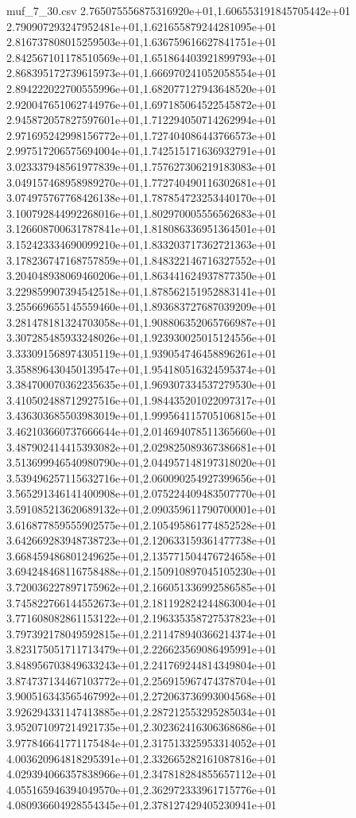 \begin{filecontents*}{muf_7_30.csv}
2.765075556875316920e+01,1.606553191845705442e+01
2.790907293247952481e+01,1.621655879244281095e+01
2.816737808015259503e+01,1.636759616627841751e+01
2.842567101178510569e+01,1.651864403921899793e+01
2.868395172739615973e+01,1.666970241052058554e+01
2.894222022700555996e+01,1.682077127943648520e+01
2.920047651062744976e+01,1.697185064522545872e+01
2.945872057827597601e+01,1.712294050714262994e+01
2.971695242998156772e+01,1.727404086443766573e+01
2.997517206575694004e+01,1.742515171636932791e+01
3.023337948561977839e+01,1.757627306219183083e+01
3.049157468958989270e+01,1.772740490116302681e+01
3.074975767768426138e+01,1.787854723253440170e+01
3.100792844992268016e+01,1.802970005556562683e+01
3.126608700631787841e+01,1.818086336951364501e+01
3.152423334690099210e+01,1.833203717362721363e+01
3.178236747168757859e+01,1.848322146716327552e+01
3.204048938069460206e+01,1.863441624937877350e+01
3.229859907394542518e+01,1.878562151952883141e+01
3.255669655145559460e+01,1.893683727687039209e+01
3.281478181324703058e+01,1.908806352065766987e+01
3.307285485933248026e+01,1.923930025015124556e+01
3.333091568974305119e+01,1.939054746458896261e+01
3.358896430450139547e+01,1.954180516324595374e+01
3.384700070362235635e+01,1.969307334537279530e+01
3.410502488712927516e+01,1.984435201022097317e+01
3.436303685503983019e+01,1.999564115705106815e+01
3.462103660737666644e+01,2.014694078511365660e+01
3.487902414415393082e+01,2.029825089367386681e+01
3.513699946540980790e+01,2.044957148197318020e+01
3.539496257115632716e+01,2.060090254927399656e+01
3.565291346141400908e+01,2.075224409483507770e+01
3.591085213620689132e+01,2.090359611790700001e+01
3.616877859555902575e+01,2.105495861774852528e+01
3.642669283948738723e+01,2.120633159361477738e+01
3.668459486801249625e+01,2.135771504476724658e+01
3.694248468116758488e+01,2.150910897045105230e+01
3.720036227897175962e+01,2.166051336992586585e+01
3.745822766144552673e+01,2.181192824244863004e+01
3.771608082861153122e+01,2.196335358727537823e+01
3.797392178049592815e+01,2.211478940366214374e+01
3.823175051711713479e+01,2.226623569086495991e+01
3.848956703849633243e+01,2.241769244814349804e+01
3.874737134467103772e+01,2.256915967474378704e+01
3.900516343565467992e+01,2.272063736993004568e+01
3.926294331147413885e+01,2.287212553295285034e+01
3.952071097214921735e+01,2.302362416306368686e+01
3.977846641771175484e+01,2.317513325953314052e+01
4.003620964818295391e+01,2.332665282161087816e+01
4.029394066357838966e+01,2.347818284855657112e+01
4.055165946394049570e+01,2.362972333961715776e+01
4.080936604928554345e+01,2.378127429405230941e+01

\end{filecontents*}
